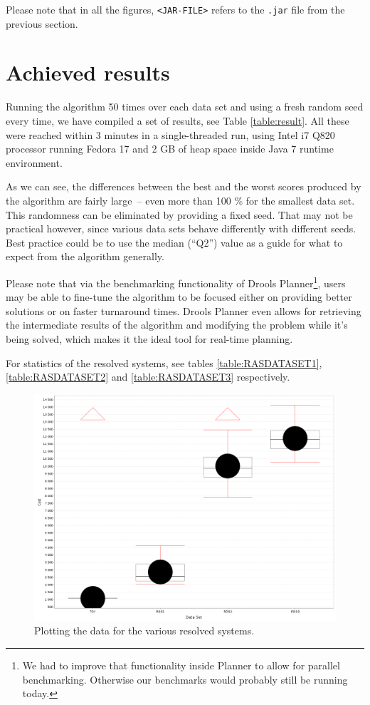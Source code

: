 \documentclass[10pt,a4paper,final]{article}
\begin{document}
Please note that in all the figures, \texttt{<JAR-FILE>} refers to the \texttt{.jar} file from the previous section.

\section{Achieved results}

Running the algorithm 50 times over each data set and using a fresh random seed every time, we have compiled a set of results, see Table \ref{table:result}. All these were reached within 3 minutes in a single-threaded run, using Intel i7 Q820 processor running Fedora 17 and 2 GB of heap space inside Java 7 runtime environment.

As we can see, the differences between the best and the worst scores produced by the algorithm are fairly large~-- even more than 100 \% for the smallest data set. This randomness can be eliminated by providing a fixed seed. That may not be practical however, since various data sets behave differently with different seeds. Best practice could be to use the median (``Q2'') value as a guide for what to expect from the algorithm generally.

Please note that via the benchmarking functionality of Drools Planner\footnote{We had to improve that functionality inside Planner to allow for parallel benchmarking. Otherwise our benchmarks would probably still be running today.}, users may be able to fine-tune the algorithm to be focused either on providing better solutions or on faster turnaround times. Drools Planner even allows for retrieving the intermediate results of the algorithm and modifying the problem while it's being solved, which makes it the ideal tool for real-time planning.

For statistics of the resolved systems, see tables \ref{table:RASDATASET1}, \ref{table:RASDATASET2} and \ref{table:RASDATASET3} respectively. 

\begin{figure}
\centering
\includegraphics[width=120mm]{chart.png}
\caption{Plotting the data for the various resolved systems.}
\label{figure:plot}
\end{figure}
\end{document}
